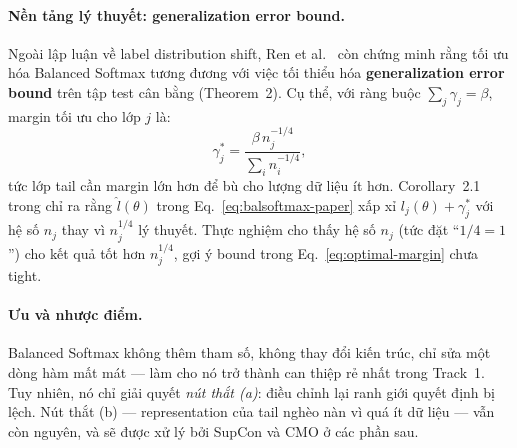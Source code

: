 \paragraph{Nền tảng lý thuyết: generalization error bound.}
Ngoài lập luận về label distribution shift, Ren et al.~\cite{ren2020balanced}
còn chứng minh rằng tối ưu hóa Balanced Softmax tương đương với việc tối thiểu hóa
\textbf{generalization error bound} trên tập test cân bằng (Theorem~2).
Cụ thể, với ràng buộc $\sum_j \gamma_j = \beta$, margin tối ưu cho lớp $j$ là:
\begin{equation}
    \gamma_j^* = \frac{\beta\, n_j^{-1/4}}{\sum_i n_i^{-1/4}},
    \label{eq:optimal-margin}
\end{equation}
tức lớp tail cần margin lớn hơn để bù cho lượng dữ liệu ít hơn.
Corollary~2.1 trong \cite{ren2020balanced} chỉ ra rằng
$\hat{l}(\theta)$ trong Eq.~\eqref{eq:balsoftmax-paper} xấp xỉ
$l_j(\theta) + \gamma_j^*$ với hệ số $n_j$ thay vì $n_j^{1/4}$ lý thuyết.
Thực nghiệm cho thấy hệ số $n_j$ (tức đặt ``$1/4 = 1$'') cho kết quả tốt hơn
$n_j^{1/4}$, gợi ý bound trong Eq.~\eqref{eq:optimal-margin} chưa tight.

\paragraph{Ưu và nhược điểm.}
Balanced Softmax không thêm tham số, không thay đổi kiến trúc, chỉ sửa một dòng
hàm mất mát --- làm cho nó trở thành can thiệp rẻ nhất trong Track~1.
Tuy nhiên, nó chỉ giải quyết \emph{nút thắt (a)}: điều chỉnh lại ranh giới
quyết định bị lệch.
Nút thắt (b) --- representation của tail nghèo nàn vì quá ít dữ liệu ---
vẫn còn nguyên, và sẽ được xử lý bởi SupCon và CMO ở các phần sau.

